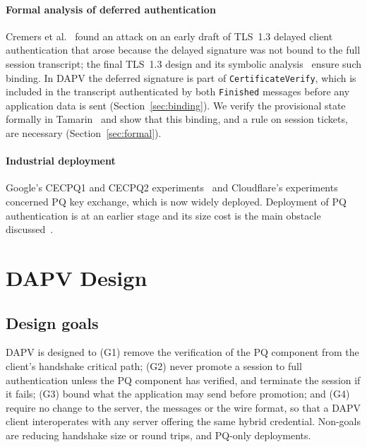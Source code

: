 \documentclass[preprint,10pt,3p]{elsarticle}
\begin{document}
\paragraph{Formal analysis of deferred authentication}  Cremers et
al.~\cite{Cremers2016} found an attack on an early draft of TLS~1.3
delayed client authentication that arose because the delayed signature was
not bound to the full session transcript; the final TLS~1.3 design and its
symbolic analysis~\cite{Cremers2017} ensure such binding.  In DAPV the
deferred signature is part of \texttt{CertificateVerify}, which is included
in the transcript authenticated by both \texttt{Finished} messages before
any application data is sent (Section~\ref{sec:binding}).  We verify the
provisional state formally in Tamarin~\cite{Tamarin2013} and show that
this binding, and a rule on session tickets, are necessary
(Section~\ref{sec:formal}).

\paragraph{Industrial deployment}  Google's CECPQ1 and CECPQ2
experiments~\cite{Braithwaite2016,Langley2016CECPQ1,Langley2018CECPQ2} and
Cloudflare's experiments~\cite{Kwiatkowski2019} concerned PQ key exchange,
which is now widely deployed.  Deployment of PQ authentication is at an
earlier stage and its size cost is the main obstacle
discussed~\cite{Langley2023Quantum,ReddyTschofenig2025}.

\section{DAPV Design}
\label{sec:design}

\subsection{Design goals}

DAPV is designed to (G1) remove the verification of the PQ component from
the client's handshake critical path; (G2) never promote a session to full
authentication unless the PQ component has verified, and terminate the
session if it fails; (G3) bound what the application may send before
promotion; and (G4) require no change to the server, the messages or the
wire format, so that a DAPV client interoperates with any server offering
the same hybrid credential.  Non-goals are reducing handshake size or round
trips, and PQ-only deployments.
\end{document}
